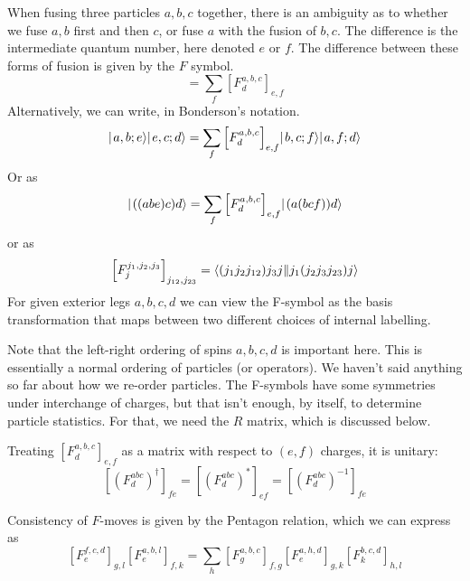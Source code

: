 \documentclass[12pt]{article}
\newcommand{\fsymbol}[6]{\mbox{$\left[ F^{#1,#2,#3}_{#4} \right]_{#5,#6}$}}
\begin{document}
When fusing three particles $a,b,c$ together, there is an ambiguity as to whether
we fuse $a,b$ first and then $c$, or fuse $a$ with the fusion of $b,c$. The difference
is the intermediate quantum number, here denoted $e$ or $f$. The difference between
these forms of fusion is given by the $F$ symbol.
\begin{equation}
\begin{gathered}

\end{gathered}
= \sum_f \fsymbol{a}{b}{c}{d}{e}{f}
\begin{gathered}

\end{gathered}
\end{equation}
Alternatively, we can write, in Bonderson's notation.
\begin{equation}
\ket{a,b;e} \ket{e,c;d} = \sum_f  \fsymbol{a}{b}{c}{d}{e}{f} \ket{b,c;f} \ket{a,f;d}
\end{equation}
Or as
\begin{equation}
\ket{((abe)c)d} = \sum_f \fsymbol{a}{b}{c}{d}{e}{f} \ket{(a(bcf))d}
\end{equation}
or as
\begin{equation}
\fsymbol{j_1}{j_2}{j_3}{j}{j_{12}}{j_{23}} 
= \rbraket{(j_1 j_2 j_{12}) j_3 j}{j_1 (j_2 j_3 j_{23}) j}
\end{equation}
For given exterior legs $a,b,c,d$ we can view the F-symbol as the basis transformation
that maps between two different choices of internal labelling.

Note that the left-right ordering of spins $a,b,c,d$ is important here. This is
essentially a normal ordering of particles (or operators). We haven't said anything so far
about how we re-order particles. The F-symbols have some symmetries under interchange of
charges, but that isn't enough, by itself, to determine particle statistics. For that, we need
the $R$ matrix, which is discussed below.

Treating $\fsymbol{a}{b}{c}{d}{e}{f}$ as a matrix with respect to $(e,f)$ charges, it is unitary:
\begin{equation}
\left[ \left(F^{abc}_{d}\right)^\dagger \right]_{fe} = 
\left[ \left(F^{abc}_{d}\right)^* \right]_{ef} = \left[ \left(F^{abc}_{d}\right)^{-1} \right]_{fe}
\end{equation}

Consistency of $F$-moves is given by the Pentagon relation, which we can express as
\begin{equation}
\fsymbol fcdegl \fsymbol ablefk = \sum_{h} \fsymbol abcgfg \fsymbol ahdegk \fsymbol bcdkhl
\end{equation}
\end{document}
